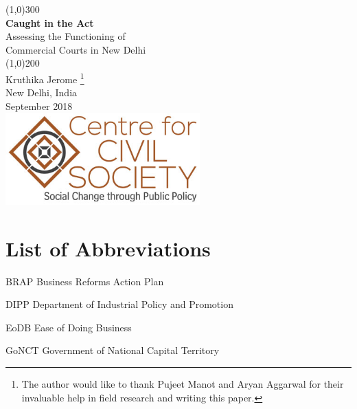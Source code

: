 \documentclass[a4paper, 12pt, twoside]{article}
\newcounter{daggerfootnote}
\newcommand*{\daggerfootnote}[1]{%
    \setcounter{daggerfootnote}{\value{footnote}}%
    \renewcommand*{\thefootnote}{\fnsymbol{footnote}}%
    \footnote[2]{#1}%
    \setcounter{footnote}{\value{daggerfootnote}}%
    \renewcommand*{\thefootnote}{\arabic{footnote}}%
    }
\begin{document}

\begin{titlepage}
\begin{center}
\line(1,0){300}\\
[0.25in]
\huge{\bfseries \textcolor{CCSbrown} {Caught in the Act}} \\
[0.5cm]
\large{Assessing the Functioning of \\ Commercial Courts in New Delhi} \\
    	
\line(1,0){200}\\
[3in]
\LARGE{Kruthika Jerome\protect\daggerfootnote{The author would like to thank Pujeet Manot and Aryan Aggarwal for their invaluable help in field research and writing this paper.}} \\ 
[1.5cm]
{\normalsize New Delhi, India} \\
{\normalsize September 2018} \\
[2cm]
\includegraphics[width = 75mm]{CCSlogo.jpg}

\end{center}
\end{titlepage}

\tableofcontents

\newpage
{}

\section*{List of Abbreviations}

\begin{abbrv}
         
        \item[BRAP]			Business Reforms Action Plan
        \item[DIPP]			Department of Industrial Policy and Promotion
        \item[EoDB]			Ease of Doing Business
        \item[GoNCT]			Government of National Capital Territory 

\end{abbrv}
\end{document}
